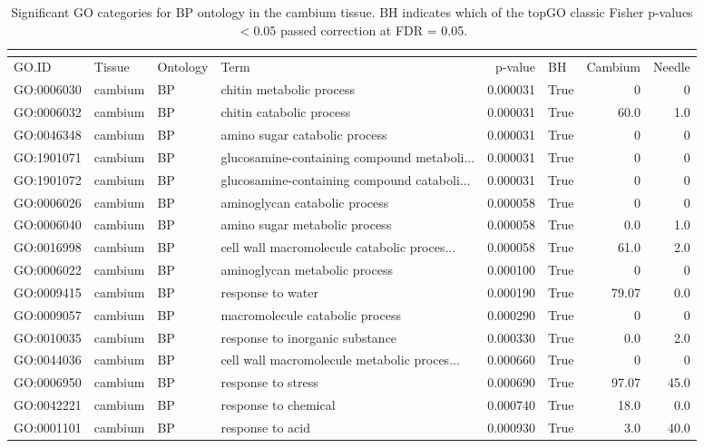 \begin{longtable}{llllrlrr}
\caption{Significant GO categories for BP ontology in the cambium tissue. BH indicates which of the topGO classic Fisher p-values $< 0.05$ passed correction at FDR = 0.05.}\\
\label{tab:go-cambium-BP}\\
\toprule
GO.ID & Tissue & Ontology & Term & p-value & BH & Cambium & Needle \\
\midrule
GO:0006030 & cambium & BP &   chitin metabolic process  & 0.000031 &   True  & 0 & 0 \\
GO:0006032 & cambium & BP &   chitin catabolic process  & 0.000031 &   True  & 60.0 & 1.0 \\ 
GO:0046348 & cambium & BP &   amino sugar catabolic process  & 0.000031 &   True  & 0 & 0 \\
GO:1901071 & cambium & BP &   glucosamine-containing compound metaboli...  & 0.000031 &   True  & 0 & 0 \\
GO:1901072 & cambium & BP &   glucosamine-containing compound cataboli...  & 0.000031 &   True  & 0 & 0 \\
GO:0006026 & cambium & BP &   aminoglycan catabolic process  & 0.000058 &   True  & 0 & 0 \\
GO:0006040 & cambium & BP &   amino sugar metabolic process  & 0.000058 &   True  & 0.0 & 1.0 \\ 
GO:0016998 & cambium & BP &   cell wall macromolecule catabolic proces...  & 0.000058 &   True  & 61.0 & 2.0 \\ 
GO:0006022 & cambium & BP &   aminoglycan metabolic process  & 0.000100 &   True  & 0 & 0 \\
GO:0009415 & cambium & BP &   response to water  & 0.000190 &   True  & 79.07 & 0.0 \\ 
GO:0009057 & cambium & BP &   macromolecule catabolic process  & 0.000290 &   True  & 0 & 0 \\
GO:0010035 & cambium & BP &   response to inorganic substance  & 0.000330 &   True  & 0.0 & 2.0 \\ 
GO:0044036 & cambium & BP &   cell wall macromolecule metabolic proces...  & 0.000660 &   True  & 0 & 0 \\
GO:0006950 & cambium & BP &   response to stress  & 0.000690 &   True  & 97.07 & 45.0 \\ 
GO:0042221 & cambium & BP &   response to chemical  & 0.000740 &   True  & 18.0 & 0.0 \\ 
GO:0001101 & cambium & BP &   response to acid  & 0.000930 &   True  & 3.0 & 40.0 \\ 

\end{longtable}
